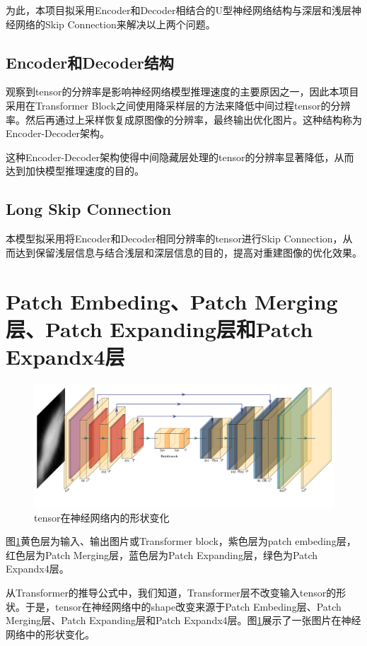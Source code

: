 为此，本项目拟采用Encoder和Decoder相结合的U型神经网络结构与深层和浅层神经网络的Skip Connection来解决以上两个问题。

\subsection{Encoder和Decoder结构}

观察到tensor的分辨率是影响神经网络模型推理速度的主要原因之一，因此本项目采用在Transformer Block之间使用降采样层的方法来降低中间过程tensor的分辨率。然后再通过上采样恢复成原图像的分辨率，最终输出优化图片。这种结构称为Encoder-Decoder架构。

这种Encoder-Decoder架构使得中间隐藏层处理的tensor的分辨率显著降低，从而达到加快模型推理速度的目的。

\subsection{Long Skip Connection}
本模型拟采用将Encoder和Decoder相同分辨率的tensor进行Skip Connection，从而达到保留浅层信息与结合浅层和深层信息的目的，提高对重建图像的优化效果。

\section{Patch Embeding、Patch Merging层、Patch Expanding层和Patch Expandx4层}

\begin{figure}[h]
	\centering
	\includegraphics[width=0.9\columnwidth]{image/chap05/img502.png}
	\caption{tensor在神经网络内的形状变化}
	\label{img502}
\end{figure}

图\ref{img502}黄色层为输入、输出图片或Transformer block，紫色层为patch embeding层，红色层为Patch Merging层，蓝色层为Patch Expanding层，绿色为Patch Expandx4层。

从Transformer的推导公式中，我们知道，Transformer层不改变输入tensor的形状。于是，tensor在神经网络中的shape改变来源于Patch Embeding层、Patch Merging层、Patch Expanding层和Patch Expandx4层。图\ref{img502}展示了一张图片在神经网络中的形状变化。


